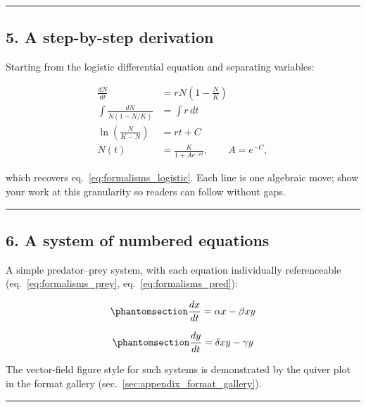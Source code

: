 \documentclass[
]{article}
\theoremstyle{plain}
\theoremstyle{definition}
\begin{document}
\begin{center}\rule{0.5\linewidth}{0.5pt}\end{center}

\subsection{5. A step-by-step
derivation}\label{a-step-by-step-derivation}

Starting from the logistic differential equation and separating
variables:

\[
\begin{aligned}
\frac{dN}{dt} &= rN\left(1 - \frac{N}{K}\right) \\
\int \frac{dN}{N(1 - N/K)} &= \int r \, dt \\
\ln\!\left(\frac{N}{K - N}\right) &= rt + C \\
N(t) &= \frac{K}{1 + A e^{-rt}}, \qquad A = e^{-C},
\end{aligned}
\]

which recovers eq.~\ref{eq:formalisms_logistic}. Each line is one
algebraic move; show your work at this granularity so readers can follow
without gaps.

\begin{center}\rule{0.5\linewidth}{0.5pt}\end{center}

\subsection{6. A system of numbered
equations}\label{a-system-of-numbered-equations}

A simple predator--prey system, with each equation individually
referenceable (eq.~\ref{eq:formalisms_prey},
eq.~\ref{eq:formalisms_pred}):

\begin{equation}\protect\phantomsection\label{eq:formalisms_prey}{ \frac{dx}{dt} = \alpha x - \beta x y }\end{equation}

\begin{equation}\protect\phantomsection\label{eq:formalisms_pred}{ \frac{dy}{dt} = \delta x y - \gamma y }\end{equation}

The vector-field figure style for such systems is demonstrated by the
quiver plot in the format gallery
(sec.~\ref{sec:appendix_format_gallery}).

\begin{center}\rule{0.5\linewidth}{0.5pt}\end{center}
\end{document}
